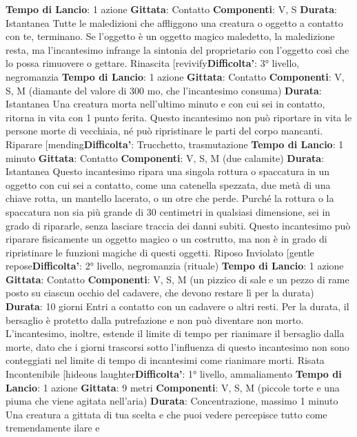\begin{multicols}{2}
\textbf{Tempo di Lancio}: 1 azione
\textbf{Gittata}: Contatto
\textbf{Componenti}: V, S
\textbf{Durata}: Istantanea
Tutte le maledizioni che affliggono una creatura o
oggetto a contatto con te, terminano. Se l’oggetto è un
oggetto magico maledetto, la maledizione resta, ma
l’incantesimo infrange la sintonia del proprietario con
l’oggetto così che lo possa rimuovere o gettare.
Rinascita
[revivify\textbf{Difficolta'}:
3° livello, negromanzia
\textbf{Tempo di Lancio}: 1 azione
\textbf{Gittata}: Contatto
\textbf{Componenti}: V, S, M (diamante del valore di 300 mo,
che l’incantesimo consuma)
\textbf{Durata}: Istantanea
Una creatura morta nell’ultimo minuto e con cui sei in
contatto, ritorna in vita con 1 punto ferita. Questo
incantesimo non può riportare in vita le persone morte
di vecchiaia, né può ripristinare le parti del corpo
mancanti.
Riparare
[mending\textbf{Difficolta'}:
Trucchetto, trasmutazione
\textbf{Tempo di Lancio}: 1 minuto
\textbf{Gittata}: Contatto
\textbf{Componenti}: V, S, M (due calamite)
\textbf{Durata}: Istantanea
Questo incantesimo ripara una singola rottura o
spaccatura in un oggetto con cui sei a contatto, come
una catenella spezzata, due metà di una chiave rotta,
un mantello lacerato, o un otre che perde. Purché la
rottura o la spaccatura non sia più grande di 30
centimetri in qualsiasi dimensione, sei in grado di
ripararle, senza lasciare traccia dei danni subiti.
Questo incantesimo può riparare fisicamente un
oggetto magico o un costrutto, ma non è in grado di
ripristinare le funzioni magiche di questi oggetti.
Riposo Inviolato
[gentle repose\textbf{Difficolta'}:
2° livello, negromanzia (rituale)
\textbf{Tempo di Lancio}: 1 azione
\textbf{Gittata}: Contatto
\textbf{Componenti}: V, S, M (un pizzico di sale e un pezzo di
rame posto su ciascun occhio del cadavere, che
devono restare lì per la durata)
\textbf{Durata}: 10 giorni
Entri a contatto con un cadavere o altri resti. Per la
durata, il bersaglio è protetto dalla putrefazione e non
può diventare non morto.
L’incantesimo, inoltre, estende il limite di tempo per
rianimare il bersaglio dalla morte, dato che i giorni
trascorsi sotto l’influenza di questo incantesimo non 
sono conteggiati nel limite di tempo di incantesimi come
rianimare morti.
Risata Incontenibile
[hideous laughter\textbf{Difficolta'}:
1° livello, ammaliamento
\textbf{Tempo di Lancio}: 1 azione
\textbf{Gittata}: 9 metri
\textbf{Componenti}: V, S, M (piccole torte e una piuma che
viene agitata nell’aria)
\textbf{Durata}: Concentrazione, massimo 1 minuto
Una creatura a gittata di tua scelta e che puoi vedere
percepisce tutto come tremendamente ilare e

\end{multicols}

